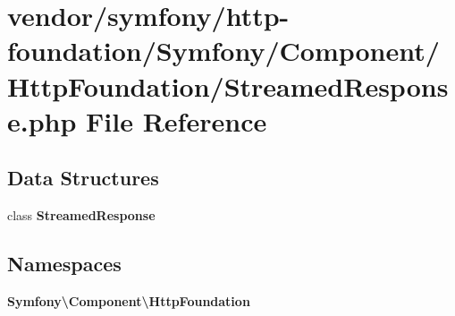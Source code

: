 \section{vendor/symfony/http-\/foundation/\+Symfony/\+Component/\+Http\+Foundation/\+Streamed\+Response.php File Reference}
\label{_streamed_response_8php}
\subsection*{Data Structures}
\begin{DoxyCompactItemize}
\item 
class {\bf Streamed\+Response}
\end{DoxyCompactItemize}
\subsection*{Namespaces}
\begin{DoxyCompactItemize}
\item 
 {\bf Symfony\textbackslash{}\+Component\textbackslash{}\+Http\+Foundation}
\end{DoxyCompactItemize}
